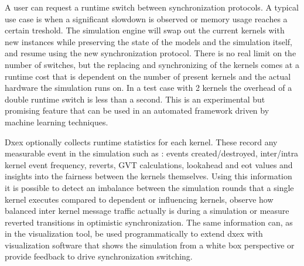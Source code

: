 A user can request a runtime switch between synchronization protocols. A typical use case is when a significant slowdown is observed or memory usage reaches a certain treshold. The simulation engine will swap out the current kernels with new instances while preserving the state of the models and the simulation itself, and resume using the new synchronization protocol. There is no real limit on the number of switches, but the replacing and synchronizing of the kernels comes at a runtime cost that is dependent on the number of present kernels and the actual hardware the simulation runs on. In a test case with 2 kernels the overhead of a double runtime switch is less than a second.
This is an experimental but promising feature that can be used in an automated framework driven by machine learning techniques.

Dxex optionally collects runtime statistics for each kernel. These record any measurable event in the simulation such as : events created/destroyed, inter/intra kernel event frequency, reverts, GVT calculations, lookahead and eot values and insights into the fairness between the kernels themselves. Using this information it is possible to detect an imbalance between the simulation rounds that a single kernel executes compared to dependent or influencing kernels, observe how balanced inter kernel message traffic actually is during a simulation or measure reverted transitions in optimistic synchronization.
The same information can, as in the visualization tool, be used programmatically to extend dxex with visualization software that shows the simulation from a white box perspective or provide feedback to drive synchronization switching.

